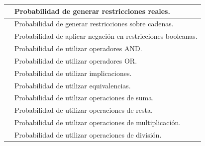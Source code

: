 \begin{longtable}{@{}P{5.3cm} P{\dimexpr\textwidth-5.3cm-2\tabcolsep\relax}@{}}
\midrule
{} & Probabilidad de generar restricciones reales. \\

\midrule
{} & Probabilidad de generar restricciones sobre cadenas. \\

\midrule
{} & Probabilidad de aplicar negación en restricciones booleanas. \\

\midrule
{} & Probabilidad de utilizar operadores AND. \\

\midrule
{} & Probabilidad de utilizar operadores OR. \\

\midrule
{} & Probabilidad de utilizar implicaciones. \\

\midrule
{} & Probabilidad de utilizar equivalencias. \\

\midrule
{} & Probabilidad de utilizar operaciones de suma. \\

\midrule
{} & Probabilidad de utilizar operaciones de resta. \\

\midrule
{} & Probabilidad de utilizar operaciones de multiplicación. \\

\midrule
{} & Probabilidad de utilizar operaciones de división. \\


\end{longtable}
